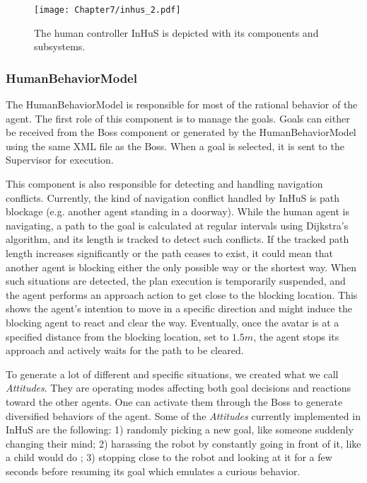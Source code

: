 \begin{figure}[h]
    \centering
    \texttt{[image: Chapter7/inhus\_2.pdf]}
    \caption{
    The human controller InHuS is depicted with its components and subsystems. 
    }
    \label{fig:inhus_only}
\end{figure}


\subsubsection{HumanBehaviorModel}

The HumanBehaviorModel is responsible for most of the rational behavior of the agent. The first role of this component is to manage the goals. Goals can either be received from the Boss component or generated by the HumanBehaviorModel using the same XML file as the Boss. When a goal is selected, it is sent to the Supervisor for execution. 

This component is also responsible for detecting and handling navigation conflicts. Currently, the kind of navigation conflict handled by InHuS is path blockage (e.g. another agent standing in a doorway). While the human agent is navigating, a path to the goal is calculated at regular intervals using Dijkstra's algorithm, and its length is tracked to detect such conflicts. If the tracked path length increases significantly or the path ceases to exist, it could mean that another agent is blocking either the only possible way or the shortest way. When such situations are detected, the plan execution is temporarily suspended, and the agent performs an approach action to get close to the blocking location. This shows the agent's intention to move in a specific direction and might induce the blocking agent to react and clear the way.
Eventually, once the avatar is at a specified distance from the blocking location, set to $1.5m$, the agent stops its approach and actively waits for the path to be cleared.

To generate a lot of different and specific situations, we created what we call \textit{Attitudes}. They are operating modes affecting both goal decisions and reactions toward the other agents. One can activate them through the Boss to generate diversified behaviors of the agent. Some of the \textit{Attitudes} currently implemented in InHuS are the following: 1) randomly picking a new goal, like someone suddenly changing their mind; 2) harassing the robot by constantly going in front of it, like a child would do \cite{nomura2016children}; 3) stopping close to the robot and looking at it for a few seconds before resuming its goal which emulates a curious behavior. 

